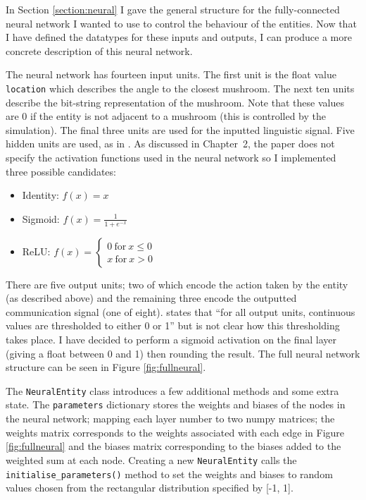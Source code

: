 \documentclass[12pt,a4paper,twoside,openright]{report}
\begin{document}
In Section \ref{section:neural} I gave the general structure for the fully-connected neural network I wanted to use to control the behaviour of the entities. Now that I have defined the datatypes for these inputs and outputs, I can produce a more concrete description of this neural network. 

The neural network has fourteen input units. The first unit is the float value \texttt{location} which describes the angle to the closest mushroom. The next ten units describe the bit-string representation of the mushroom. Note that these values are 0 if the entity is not adjacent to a mushroom (this is controlled by the simulation). The final three units are used for the inputted linguistic signal. Five hidden units are used, as in \citet{Cangelosi1998}. As discussed in Chapter~2, the paper does not specify the activation functions used in the neural network so I implemented three possible candidates:

\begin{itemize}
	\item Identity: $f(x) = x$
	\item Sigmoid: $f(x) = \frac{1}{1+e^{-x}}$
	\item ReLU: $ f(x) = 
    \left\{
        \begin{array}{ll}
          0~\mathrm{for}~x \leq 0 \\
          x~\mathrm{for}~x > 0
        \end{array}
      \right.
      $
\end{itemize}

There are five output units; two of which encode the action taken by the entity (as described above) and the remaining three encode the outputted communication signal (one of eight). \citet{Cangelosi1998} states that ``for all output units, continuous values are thresholded to either 0 or 1'' but is not clear how this thresholding takes place. I have decided to perform a sigmoid activation on the final layer (giving a float between 0 and 1) then rounding the result. The full neural network structure can be seen in Figure \ref{fig:fullneural}.

The \texttt{NeuralEntity} class introduces a few additional methods and some extra state. The \texttt{parameters} dictionary stores the weights and biases of the nodes in the neural network; mapping each layer number to two numpy matrices; the weights matrix corresponds to the weights associated with each edge in Figure \ref{fig:fullneural} and the biases matrix corresponding to the biases added to the weighted sum at each node. Creating a new \texttt{NeuralEntity} calls the \texttt{initialise\_parameters()} method to set the weights and biases to random values chosen from the rectangular distribution specified by [-1, 1].
\end{document}
